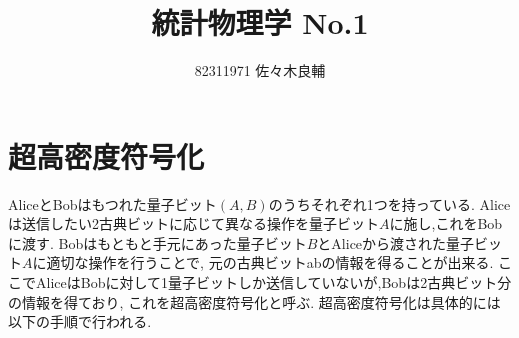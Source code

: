 \documentclass[uplatex,a4j,11pt,dvipdfmx]{jsarticle}
\begin{document}
\title{統計物理学 No.1}
\author{82311971 佐々木良輔}
\date{}
\maketitle
\section*{超高密度符号化}
AliceとBobはもつれた量子ビット$(A,B)$のうちそれぞれ1つを持っている.
Aliceは送信したい2古典ビットに応じて異なる操作を量子ビット$A$に施し,これをBobに渡す.
Bobはもともと手元にあった量子ビット$B$とAliceから渡された量子ビット$A$に適切な操作を行うことで,
元の古典ビットabの情報を得ることが出来る.
ここでAliceはBobに対して1量子ビットしか送信していないが,Bobは2古典ビット分の情報を得ており,
これを超高密度符号化と呼ぶ.
超高密度符号化は具体的には以下の手順で行われる.
\end{document}
